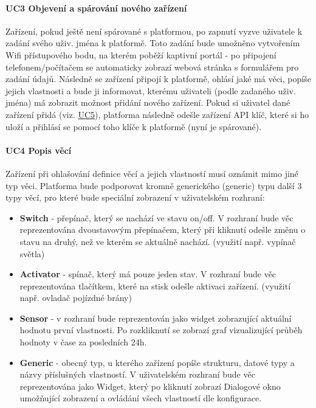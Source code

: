 \paragraph{UC3 Objevení a spárování nového zařízení}
Zařízení, pokud ještě není spárované s platformou, po zapnutí vyzve uživatele k zadání svého uživ. jména k platformě. Toto zadání bude umožněno vytvořením Wifi přístupového bodu, na kterém poběží kaptivní portál - po připojení telefonem/počítačem se automaticky zobrazí webová stránka s formulářem pro zadání údajů. Následně se zařízení připojí k platformě, ohlásí jaké má věci, popíše jejich vlastnosti a bude ji informovat, kterému uživateli (podle zadaného uživ. jména) má zobrazit možnost přidání nového zařízení. Pokud si uživatel dané zařízení přidá (viz. \hyperref[UC5]{UC5}), platforma následně odešle zařízení API klíč, které si ho uloží a přihlásí se pomocí toho klíče k platformě (nyní je spárované).

\paragraph{UC4 Popis věcí}
Zařízení při ohlašování definice věcí a jejich vlastností musí oznámit mimo jiné typ věci. Platforma bude podporovat kromně generického (generic) typu další 3 typy věcí, pro které bude speciální zobrazení v uživatelském rozhraní:
\begin{itemize}
    \item \textbf{Switch} - přepínač, který se nachází ve stavu on/off. V rozhraní bude věc reprezentována dvoustavovým přepínačem, který při kliknutí odešle změnu o stavu na druhý, než ve kterém se aktuálně nachází. (využití např. vypínač světla)
    \item \textbf{Activator} - spínač, který má pouze jeden stav. V rozhraní bude věc reprezentována tlačítkem, které na stisk odešle aktivaci zařízení. (využití např. ovladač pojízdné brány)
    \item \textbf{Sensor} - v rozhraní bude reprezentován jako widget zobrazující aktuální hodnotu první vlastnosti. Po rozkliknutí se zobrazí graf vizualizující průběh hodnoty v čase za posledních 24h.
    \item \textbf{Generic} - obecný typ, u kterého zařízení popíše strukturu, datové typy a názvy příslušných vlastností. V uživatelském rozhraní bude věc reprezentována jako Widget, který po kliknutí zobrazí Dialogové okno umožňující zobrazení a ovládání všech vlastností dle konfigurace.
\end{itemize}

